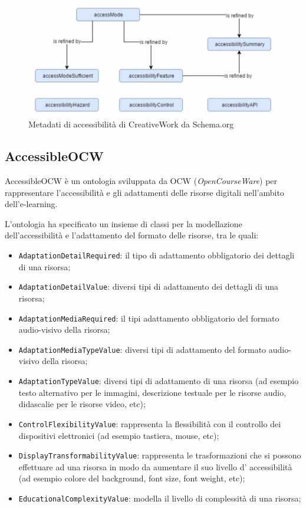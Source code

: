\begin{figure}[H]
\centering
\includegraphics[scale=0.7]{res/schemaorg.png}
\caption{Metadati di accessibilità di CreativeWork da Schema.org}
\label{fig:schemaorg}
\end{figure}

\subsection{AccessibleOCW}
AccessibleOCW è un ontologia sviluppata da OCW (\textit{OpenCourseWare}) per rappresentare l'accessibilità e gli adattamenti delle risorse digitali nell'ambito dell'e-learning.

L'ontologia ha specificato un insieme di classi per la modellazione dell'accessibilità e l'adattamento del formato delle risorse, tra le quali:
\begin{itemize}
    \item \texttt{AdaptationDetailRequired}: il tipo di adattamento obbligatorio dei dettagli di una risorsa;
    \item \texttt{AdaptationDetailValue}: diversi tipi di adattamento dei dettagli di una risorsa;
    \item \texttt{AdaptationMediaRequired}: il tipi adattamento obbligatorio del formato audio-visivo della risorsa;
    \item \texttt{AdaptationMediaTypeValue}: diversi tipi di adattamento del formato audio-visivo della risorsa;
    \item \texttt{AdaptationTypeValue}: diversi tipi di adattamento di una risorsa (ad esempio testo alternativo per le immagini, descrizione testuale per le risorse audio, didascalie per le risorse video, etc);
    \item \texttt{ControlFlexibilityValue}: rappresenta la flessibilità con il controllo dei dispositivi elettronici (ad esempio tastiera, mouse, etc);
    \item \texttt{DisplayTransformabilityValue}: rappresenta le trasformazioni che si possono effettuare ad una risorsa in modo da aumentare il suo livello d' accessibilità (ad esempio colore del background, font size, font weight, etc);
    \item \texttt{EducationalComplexityValue}: modella il livello di complessità di una risorsa;
\end{itemize}
